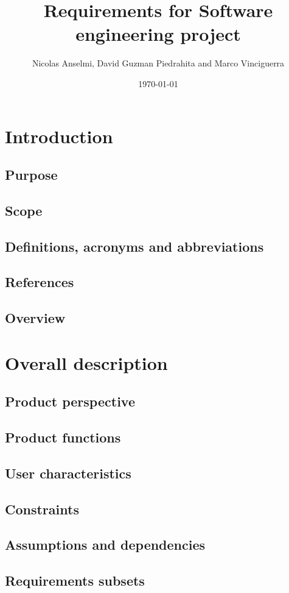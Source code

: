 \documentclass{article}
\title{Requirements for Software engineering project}
\author{Nicolas Anselmi, David Guzman Piedrahita and Marco Vinciguerra}
\date{\today}
\begin{document}
\maketitle

\section{Introduction} 
\subsection{Purpose} 
\subsection{Scope}
\subsection {Definitions, acronyms and abbreviations }
\subsection {References} 
\subsection {Overview} 
\section {Overall description} 
\subsection {Product perspective} 
\subsection {Product functions} 
\subsection {User characteristics} 
\subsection {Constraints} 
\subsection {Assumptions and dependencies}
\subsection {Requirements subsets} 
\end{document}
